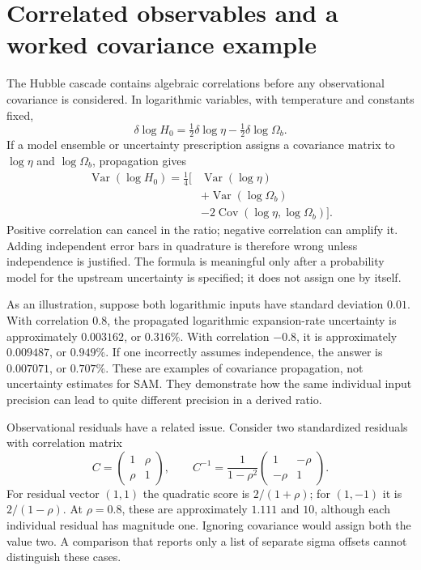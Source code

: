 \section{Correlated observables and a worked covariance example}
The Hubble cascade contains algebraic correlations before any observational covariance is considered. In logarithmic variables, with temperature and constants fixed,
\begin{equation}
 \delta\log H_0=\tfrac12\delta\log\eta
 -\tfrac12\delta\log\Omega_b.
 \label{c8:covgradient}
\end{equation}
If a model ensemble or uncertainty prescription assigns a covariance matrix to $\log\eta$ and $\log\Omega_b$, propagation gives
\begin{equation}
 \begin{aligned}
 \operatorname{Var}(\log H_0)=\tfrac14\bigl[&\operatorname{Var}(\log\eta)\\
 &+\operatorname{Var}(\log\Omega_b)\\
 &-2\operatorname{Cov}(\log\eta,\log\Omega_b)\bigr].
 \end{aligned}
 \label{c8:covH}
\end{equation}
Positive correlation can cancel in the ratio; negative correlation can amplify it. Adding independent error bars in quadrature is therefore wrong unless independence is justified. The formula is meaningful only after a probability model for the upstream uncertainty is specified; it does not assign one by itself.

As an illustration, suppose both logarithmic inputs have standard deviation $0.01$. With correlation $0.8$, the propagated logarithmic expansion-rate uncertainty is approximately $0.003162$, or $0.316\%$. With correlation $-0.8$, it is approximately $0.009487$, or $0.949\%$. If one incorrectly assumes independence, the answer is $0.007071$, or $0.707\%$. These are examples of covariance propagation, not uncertainty estimates for SAM. They demonstrate how the same individual input precision can lead to quite different precision in a derived ratio.

Observational residuals have a related issue. Consider two standardized residuals with correlation matrix
\begin{equation}
 C=\begin{pmatrix}1&\rho\\\rho&1\end{pmatrix},\qquad
 C^{-1}=\frac1{1-\rho^2}
 \begin{pmatrix}1&-\rho\\-\rho&1\end{pmatrix}.
 \label{c8:twocov}
\end{equation}
For residual vector $(1,1)$ the quadratic score is $2/(1+\rho)$; for $(1,-1)$ it is $2/(1-\rho)$. At $\rho=0.8$, these are approximately $1.111$ and $10$, although each individual residual has magnitude one. Ignoring covariance would assign both the value two. A comparison that reports only a list of separate sigma offsets cannot distinguish these cases.


